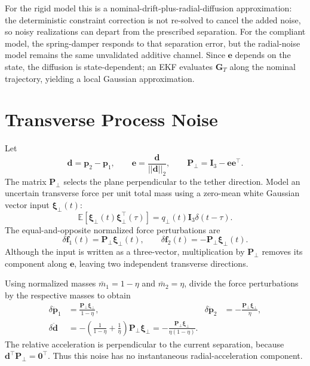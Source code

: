 \documentclass[]{article}
\newcommand{\norm}[1]{\left| \left| #1 \right| \right|_{2}}
\newcommand{\Gm}{\mathbf{G}}
\begin{document}
For the rigid model this is a nominal-drift-plus-radial-diffusion
approximation: the deterministic constraint correction is not re-solved to
cancel the added noise, so noisy realizations can depart from the prescribed
separation. For the compliant model, the spring-damper responds to that
separation error, but the radial-noise model remains the same unvalidated
additive channel. Since $\mathbf{e}$ depends on the state, the diffusion is
state-dependent; an EKF evaluates $\Gm_T$ along the nominal trajectory,
yielding a local Gaussian approximation.

\section{Transverse Process Noise}

Let
\begin{equation}
  \mathbf{d}=\mathbf{p}_2-\mathbf{p}_1,\qquad
  \mathbf{e}=\frac{\mathbf{d}}{\norm{\mathbf{d}}},\qquad
  \mathbf{P}_\perp=\mathbf{I}_3-\mathbf{e}\mathbf{e}^\top.
\end{equation}
The matrix $\mathbf{P}_\perp$ selects the plane perpendicular to the tether
direction. Model an uncertain transverse force per unit total mass
using a zero-mean white Gaussian vector input $\bm{\xi}_\perp(t)$:
\begin{equation}
  \mathbb{E}\!\left[
    \bm{\xi}_\perp(t)\bm{\xi}_\perp^\top(\tau)
  \right]
  =q_\perp(t)\mathbf{I}_3\delta(t-\tau).
\end{equation}
The equal-and-opposite normalized force perturbations are
\begin{equation}
  \delta\mathbf{f}_1(t)=\mathbf{P}_\perp\bm{\xi}_\perp(t),\qquad
  \delta\mathbf{f}_2(t)=-\mathbf{P}_\perp\bm{\xi}_\perp(t).
\end{equation}
Although the input is written as a three-vector, multiplication by
$\mathbf{P}_\perp$ removes its component along $\mathbf{e}$, leaving two
independent transverse directions.

Using normalized masses $\bar m_1=1-\eta$ and $\bar m_2=\eta$, divide the
force perturbations by the respective masses to obtain
\begin{align}
  \delta\ddot{\mathbf{p}}_1
    &=\frac{\mathbf{P}_\perp\bm{\xi}_\perp}{1-\eta}, &
  \delta\ddot{\mathbf{p}}_2
    &=-\frac{\mathbf{P}_\perp\bm{\xi}_\perp}{\eta}, \\
  \delta\ddot{\mathbf{d}}
    &=-\left(\frac{1}{1-\eta}+\frac{1}{\eta}\right)
      \mathbf{P}_\perp\bm{\xi}_\perp
    =-\frac{\mathbf{P}_\perp\bm{\xi}_\perp}{\eta(1-\eta)}.
\end{align}
The relative acceleration is perpendicular to the current separation,
because $\mathbf{d}^\top\mathbf{P}_\perp=\mathbf{0}^\top$. Thus this noise
has no instantaneous radial-acceleration component.
\end{document}
